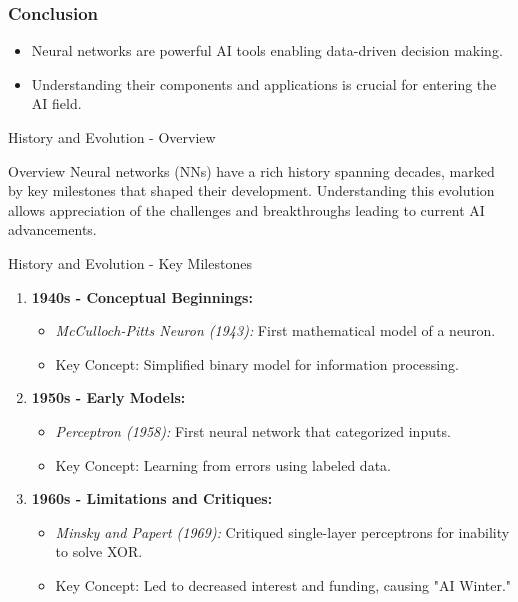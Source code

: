 \documentclass[aspectratio=169]{beamer}
\begin{document}
\begin{frame}[fragile]
    \frametitle{Conclusion}
    \begin{itemize}
        \item Neural networks are powerful AI tools enabling data-driven decision making.
        \item Understanding their components and applications is crucial for entering the AI field.
    \end{itemize}
\end{frame}

\begin{frame}[fragile]{History and Evolution - Overview}
    \begin{block}{Overview}
        Neural networks (NNs) have a rich history spanning decades, marked by key milestones that shaped their development. Understanding this evolution allows appreciation of the challenges and breakthroughs leading to current AI advancements.
    \end{block}
\end{frame}

\begin{frame}[fragile]{History and Evolution - Key Milestones}
    \begin{enumerate}
        \item \textbf{1940s - Conceptual Beginnings:}
            \begin{itemize}
                \item \textit{McCulloch-Pitts Neuron (1943):} First mathematical model of a neuron.
                \item Key Concept: Simplified binary model for information processing.
            \end{itemize}
        
        \item \textbf{1950s - Early Models:}
            \begin{itemize}
                \item \textit{Perceptron (1958):} First neural network that categorized inputs.
                \item Key Concept: Learning from errors using labeled data.
            \end{itemize}
        
        \item \textbf{1960s - Limitations and Critiques:}
            \begin{itemize}
                \item \textit{Minsky and Papert (1969):} Critiqued single-layer perceptrons for inability to solve XOR.
                \item Key Concept: Led to decreased interest and funding, causing "AI Winter."
            \end{itemize}
    \end{enumerate}
\end{frame}
\end{document}
